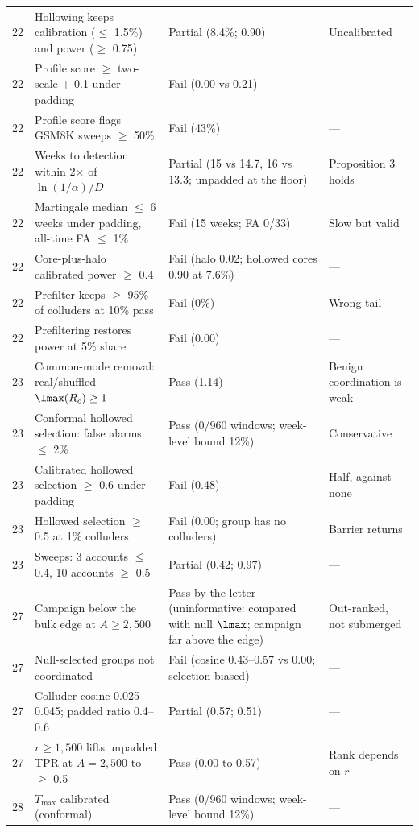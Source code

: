 \begin{longtable}{p{}p{}p{}p{}}
22 & Hollowing keeps calibration ($\le$ 1.5\%) and power ($\ge$ 0.75) & Partial (8.4\%; 0.90) & Uncalibrated \\
22 & Profile score $\ge$ two-scale + 0.1 under padding & Fail (0.00 vs 0.21) & --- \\
22 & Profile score flags GSM8K sweeps $\ge$ 50\% & Fail (43\%) & --- \\
22 & Weeks to detection within 2$\times$ of $\ln(1/\alpha)/D$ & Partial (15 vs 14.7, 16 vs 13.3; unpadded at the floor) & Proposition 3 holds \\
22 & Martingale median $\le$ 6 weeks under padding, all-time FA $\le$ 1\% & Fail (15 weeks; FA 0/33) & Slow but valid \\
22 & Core-plus-halo calibrated power $\ge$ 0.4 & Fail (halo 0.02; hollowed cores 0.90 at 7.6\%) & --- \\
22 & Prefilter keeps $\ge$ 95\% of colluders at 10\% pass & Fail (0\%) & Wrong tail \\
22 & Prefiltering restores power at 5\% share & Fail (0.00) & --- \\
23 & Common-mode removal: real/shuffled $\lmax(R_c)\ge 1$ & Pass (1.14) & Benign coordination is weak \\
23 & Conformal hollowed selection: false alarms $\le$ 2\% & Pass (0/960 windows; week-level bound 12\%) & Conservative \\
23 & Calibrated hollowed selection $\ge$ 0.6 under padding & Fail (0.48) & Half, against none \\
23 & Hollowed selection $\ge$ 0.5 at 1\% colluders & Fail (0.00; group has no colluders) & Barrier returns \\
23 & Sweeps: 3 accounts $\le$ 0.4, 10 accounts $\ge$ 0.5 & Partial (0.42; 0.97) & --- \\
27 & Campaign below the bulk edge at $A\ge 2{,}500$ & Pass by the letter (uninformative: compared with null $\lmax$; campaign far above the edge) & Out-ranked, not submerged \\
27 & Null-selected groups not coordinated & Fail (cosine 0.43--0.57 vs 0.00; selection-biased) & --- \\
27 & Colluder cosine 0.025--0.045; padded ratio 0.4--0.6 & Partial (0.57; 0.51) & --- \\
27 & $r\ge 1{,}500$ lifts unpadded TPR at $A=2{,}500$ to $\ge$ 0.5 & Pass (0.00 to 0.57) & Rank depends on $r$ \\
28 & $T_{\max}$ calibrated (conformal) & Pass (0/960 windows; week-level bound 12\%) & --- \\

\end{longtable}
